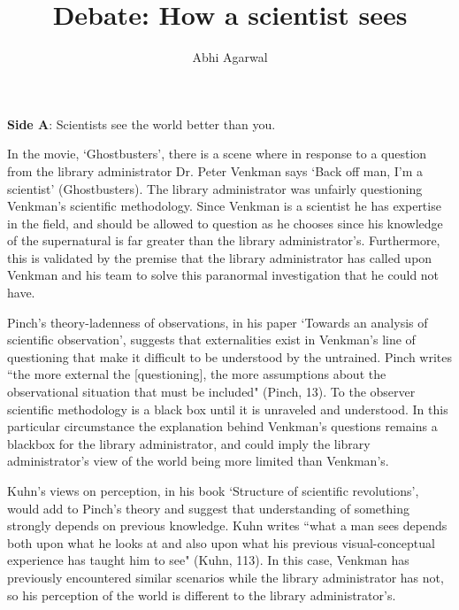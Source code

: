 \documentclass[11pt, oneside]{article}
\title{Debate: How a scientist sees\vspace{-0.4cm}}
\author{Abhi Agarwal\vspace{-1cm}}
\date{}
\begin{document}
\maketitle


\noindent \textbf{Side A}: Scientists see the world better than you.

\par In the movie, `Ghostbusters', there is a scene where in response to a question from the library administrator Dr. Peter Venkman says `Back off man, I'm a scientist' (Ghostbusters). The library administrator was unfairly questioning Venkman's scientific methodology. Since Venkman is a scientist he has expertise in the field, and should be allowed to question as he chooses since his knowledge of the supernatural is far greater than the library administrator's. Furthermore, this is validated by the premise that the library administrator has called upon Venkman and his team to solve this paranormal investigation that he could not have.


\par Pinch's theory-ladenness of observations, in his paper `Towards an analysis of scientific observation', suggests that externalities exist in Venkman's line of questioning that make it difficult to be understood by the untrained. Pinch writes ``the more external the [questioning], the more assumptions about the observational situation that must be included" (Pinch, 13). To the observer scientific methodology is a black box until it is unraveled and understood. In this particular circumstance the explanation behind Venkman's questions remains a blackbox for the library administrator, and could imply the library administrator's view of the world being more limited than Venkman's.

\par Kuhn's views on perception, in his book `Structure of scientific revolutions', would add to Pinch's theory and suggest that understanding of something strongly depends on previous knowledge. Kuhn writes ``what a man sees depends both upon what he looks at and also upon what his previous visual-conceptual experience has taught him to see" (Kuhn, 113). In this case, Venkman has previously encountered similar scenarios while the library administrator has not, so his perception of the world is different to the library administrator's. 
\end{document}
